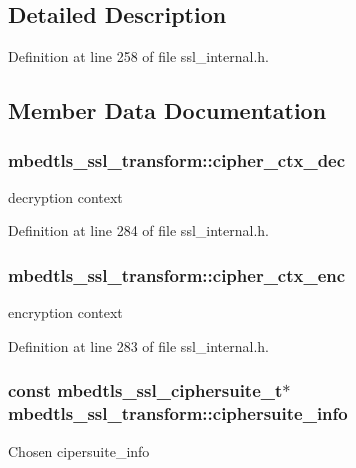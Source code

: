 \subsection{Detailed Description}


Definition at line 258 of file ssl\-\_\-internal.\-h.



\subsection{Member Data Documentation}
\hypertarget{structmbedtls__ssl__transform_a8f7e9c4b90dda8083df54037e5be955e}{
\subsubsection[{cipher\-\_\-ctx\-\_\-dec}]{ mbedtls\-\_\-ssl\-\_\-transform\-::cipher\-\_\-ctx\-\_\-dec}}\label{structmbedtls__ssl__transform_a8f7e9c4b90dda8083df54037e5be955e}
decryption context 

Definition at line 284 of file ssl\-\_\-internal.\-h.

\hypertarget{structmbedtls__ssl__transform_a4a1c49f6f40086491dd8dd059f163a61}{
\subsubsection[{cipher\-\_\-ctx\-\_\-enc}]{ mbedtls\-\_\-ssl\-\_\-transform\-::cipher\-\_\-ctx\-\_\-enc}}\label{structmbedtls__ssl__transform_a4a1c49f6f40086491dd8dd059f163a61}
encryption context 

Definition at line 283 of file ssl\-\_\-internal.\-h.

\hypertarget{structmbedtls__ssl__transform_a669b64ca817f92c2f2da4531745b5563}{
\subsubsection[{ciphersuite\-\_\-info}]{\setlength{\rightskip}{0pt plus 5cm}const {\bf mbedtls\-\_\-ssl\-\_\-ciphersuite\-\_\-t}$\ast$ mbedtls\-\_\-ssl\-\_\-transform\-::ciphersuite\-\_\-info}}\label{structmbedtls__ssl__transform_a669b64ca817f92c2f2da4531745b5563}
Chosen cipersuite\-\_\-info 

